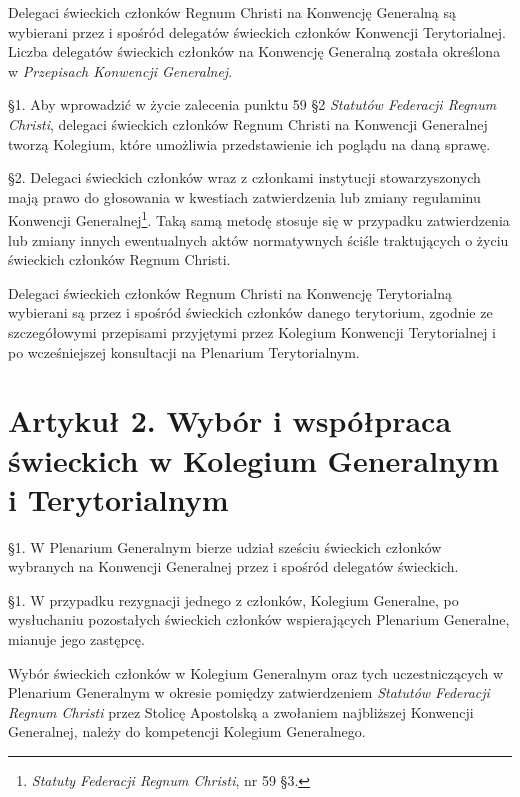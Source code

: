  Delegaci świeckich członków Regnum Christi na Konwencję Generalną są wybierani przez i spośród delegatów świeckich członków Konwencji Terytorialnej. Liczba delegatów świeckich członków na Konwencję Generalną została określona w {\em Przepisach Konwencji Generalnej}.


 \S{}1. Aby wprowadzić w życie zalecenia punktu 59 \S{}2 {\em Statutów Federacji Regnum Christi}, delegaci świeckich członków Regnum Christi na Konwencji Generalnej tworzą Kolegium, które umożliwia przedstawienie ich poglądu na daną sprawę.

\S{}2. Delegaci świeckich członków wraz z członkami instytucji stowarzyszonych mają prawo do głosowania w kwestiach zatwierdzenia lub zmiany regulaminu Konwencji Generalnej\footnote{{\em Statuty Federacji Regnum Christi}, nr 59 \S{}3.}. Taką samą metodę stosuje się w przypadku zatwierdzenia lub zmiany innych ewentualnych aktów normatywnych ściśle traktujących o życiu świeckich członków Regnum Christi.


 Delegaci świeckich członków Regnum Christi na Konwencję Terytorialną wybierani są przez i spośród świeckich członków danego terytorium, zgodnie ze szczegółowymi przepisami przyjętymi przez Kolegium Konwencji Terytorialnej i po wcześniejszej konsultacji na Plenarium Terytorialnym.


\section{Artykuł 2. Wybór i współpraca świeckich w Kolegium Generalnym i Terytorialnym}


 \S{}1. W Plenarium Generalnym bierze udział sześciu świeckich członków wybranych na Konwencji Generalnej przez i spośród delegatów świeckich.

\S{}1. W przypadku rezygnacji jednego z członków, Kolegium Generalne, po wysłuchaniu pozostałych świeckich członków wspierających Plenarium Generalne, mianuje jego zastępcę.


Wybór świeckich członków w Kolegium Generalnym oraz tych uczestniczących w Plenarium Generalnym w okresie pomiędzy zatwierdzeniem {\em Statutów Federacji Regnum Christi} przez Stolicę Apostolską a zwołaniem najbliższej Konwencji Generalnej, należy do kompetencji Kolegium Generalnego.

